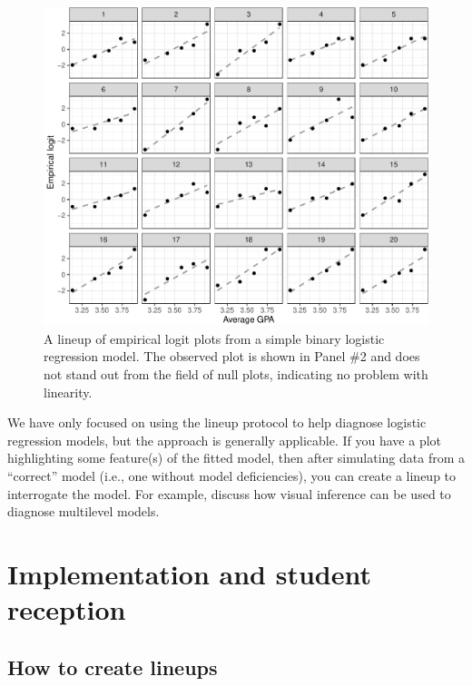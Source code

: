 \documentclass[12pt]{article}
\begin{document}
\begin{figure}
\centering
\includegraphics{vizinf-paper_files/figure-latex/unnamed-chunk-8-1.pdf}
\caption{\label{fig:emplogitlineup} A lineup of empirical logit plots
from a simple binary logistic regression model. The observed plot is
shown in Panel \#2 and does not stand out from the field of null plots,
indicating no problem with linearity.}
\end{figure}

We have only focused on using the lineup protocol to help diagnose
logistic regression models, but the approach is generally applicable. If
you have a plot highlighting some feature(s) of the fitted model, then
after simulating data from a ``correct'' model (i.e., one without model
deficiencies), you can create a lineup to interrogate the model. For
example, \cite{Loy2017-fo} discuss how visual inference can be used to
diagnose multilevel models.

\clearpage

\hypertarget{implementation-and-student-reception}{%
\section{Implementation and student
reception}\label{implementation-and-student-reception}}

\label{sec:implement}

\hypertarget{how-to-create-lineups}{%
\subsection{How to create lineups}\label{how-to-create-lineups}}
\end{document}
